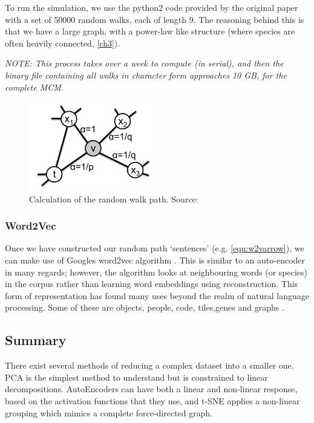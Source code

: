 To run the simulation, we use the python2 code provided by the original paper \citep{node2vec} with a set of 50000 random walks, each of length 9. The reasoning behind this is that we have a large graph, with a power-law like structure (where species are often heavily connected, \autoref{ch3}).

\textit{NOTE: This process takes over a week to compute (in serial), and then the binary file containing all walks in character form approaches 10 GB, for the complete MCM. }

\begin{figure}[H]
  \centering
\includegraphics[width=0.5\textwidth]{4fig/n2vedge.png}
\caption{Calculation of the random walk path. Source:\citep{node2vec}}\label{fig:n2vedge}
\end{figure}



\subsubsection{Word2Vec}\label{sec:w2v}
Once we have constructed our random path `sentences' (e.g. \autoref{eqn:w2varrow}), we can make use of Googles word2vec algorithm \citep{w2v}. This is similar to an auto-encoder in many regards; however, the algorithm looks at neighbouring words (or species) in the corpus rather than learning word embeddings using reconstruction. This form of representation has found many uses beyond the realm of natural language processing. Some of these are objects, people, code, tiles,genes and graphs \citep{objects,people,code,tile,gene,graph2vec}.


% 
% 

\subsection{Summary}
There exist several methods of reducing a complex dataset into a smaller one. PCA is the simplest method to understand but is constrained to linear decompositions. AutoEncoders can have both a linear and non-linear response, based on the activation functions that they use, and t-SNE applies a non-linear grouping which mimics a complete force-directed graph. 

